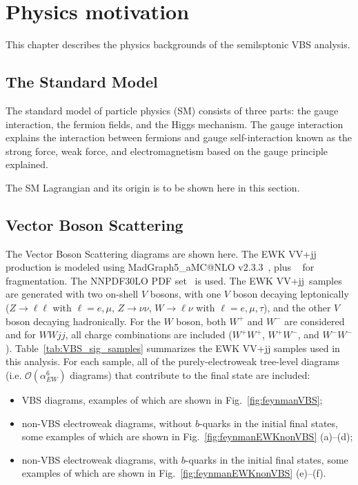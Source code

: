 \chapter{Physics motivation}

This chapter describes the physics backgrounds of the semilsptonic VBS analysis.

\section{The Standard Model}
The standard model of particle physics (SM) consists of three parts: the gauge interaction, the fermion fields, and the Higgs mechanism. The gauge interaction explains the interaction between fermions and gauge self-interaction known as the strong force, weak force, and electromagnetism based on the gauge principle explained.

The SM Lagrangian and its origin is to be shown here in this section.

\section{Vector Boson Scattering}
The Vector Boson Scattering diagrams are shown here.
The EWK VV+jj production is modeled using MadGraph5\_aMC@NLO v2.3.3~\cite{Alwall:2014hca},
plus ~\cite{Sjostrand:2007gs} for fragmentation.
The \textsc{NNPDF30LO} PDF set~\cite{Ball:2012cx} is used.
The EWK VV+jj\ samples are generated with two on-shell $V$ bosons, with one $V$ boson decaying leptonically
($Z\to \ell\ell$ with $\ell = e, \mu$, $Z\to \nu\nu$, $W\to \ell \nu$ with $\ell= e, \mu, \tau$),
and the other $V$ boson decaying hadronically.
For the $W$ boson, both $W^{+}$ and $W^{-}$ are considered and for $WWjj$, all charge combinations are included
($W^{+}W^{+}$, $W^{+}W^{-}$, and $W^{-}W^{-}$).
Table~\ref{tab:VBS_sig_samples} summarizes the EWK VV+jj samples used in this analysis.
For each sample, all of the purely-electroweak tree-level diagrams (i.e. $\mathcal{O}(\alpha_{EW}^6)$ diagrams)
that contribute to the final state are included:
\begin{itemize}
  \item VBS diagrams, examples of which are shown in Fig.~\ref{fig:feynmanVBS};
  \item non-VBS electroweak diagrams, without $b$-quarks in the initial final states, some examples of which are shown in Fig.~\ref{fig:feynmanEWKnonVBS} (a)--(d);
  \item non-VBS electroweak diagrams, with $b$-quarks in the initial final states, some examples of which are shown in Fig.~\ref{fig:feynmanEWKnonVBS} (e)--(f).
\end{itemize}

